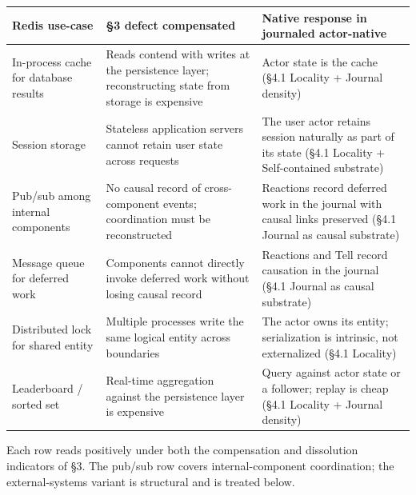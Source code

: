 \documentclass[
]{article}
\newcounter{none} %
\begin{document}
{\def\LTcaptype{none} %
\begin{longtable}[]{@{}
  >{\raggedright\arraybackslash}p{}
  >{\raggedright\arraybackslash}p{}
  >{\raggedright\arraybackslash}p{}@{}}
\toprule\noalign{}
\begin{minipage}[b]{\linewidth}\raggedright
Redis use-case
\end{minipage} & \begin{minipage}[b]{\linewidth}\raggedright
§3 defect compensated
\end{minipage} & \begin{minipage}[b]{\linewidth}\raggedright
Native response in journaled actor-native
\end{minipage} \\
\midrule\noalign{}
\endhead
\bottomrule\noalign{}
\endlastfoot
In-process cache for database results & Reads contend with writes at the
persistence layer; reconstructing state from storage is expensive &
Actor state is the cache (§4.1 Locality + Journal density) \\
Session storage & Stateless application servers cannot retain user state
across requests & The user actor retains session naturally as part of
its state (§4.1 Locality + Self-contained substrate) \\
Pub/sub among internal components & No causal record of cross-component
events; coordination must be reconstructed & Reactions record deferred
work in the journal with causal links preserved (§4.1 Journal as causal
substrate) \\
Message queue for deferred work & Components cannot directly invoke
deferred work without losing causal record & Reactions and Tell record
causation in the journal (§4.1 Journal as causal substrate) \\
Distributed lock for shared entity & Multiple processes write the same
logical entity across boundaries & The actor owns its entity;
serialization is intrinsic, not externalized (§4.1 Locality) \\
Leaderboard / sorted set & Real-time aggregation against the persistence
layer is expensive & Query against actor state or a follower; replay is
cheap (§4.1 Locality + Journal density) \\
\end{longtable}
}

Each row reads positively under both the compensation and dissolution
indicators of §3. The pub/sub row covers internal-component
coordination; the external-systems variant is structural and is treated
below.
\end{document}
